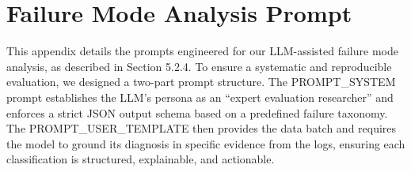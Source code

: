 \documentclass[11pt]{article}
\begin{document}
\section{Failure Mode Analysis Prompt}
\label{sec:appendix-failure}

This appendix details the prompts engineered for our LLM-assisted failure mode analysis, as described in Section 5.2.4. To ensure a systematic and reproducible evaluation, we designed a two-part prompt structure. The PROMPT\_SYSTEM prompt establishes the LLM's persona as an ``expert evaluation researcher'' and enforces a strict JSON output schema based on a predefined failure taxonomy. The PROMPT\_USER\_TEMPLATE then provides the data batch and requires the model to ground its diagnosis in specific evidence from the logs, ensuring each classification is structured, explainable, and actionable.
\end{document}
